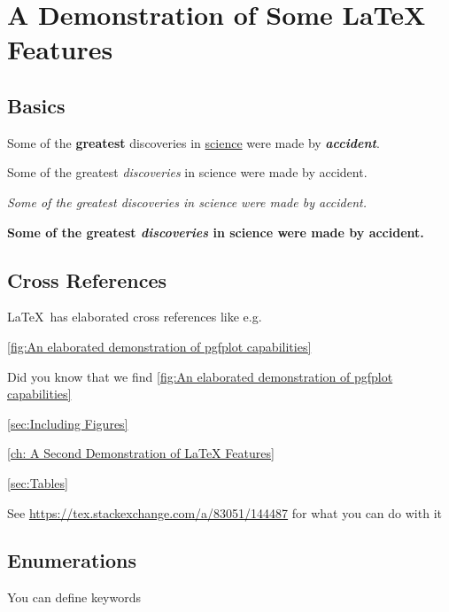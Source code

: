 \chapter[Demo]{A Demonstration of Some LaTeX Features}
\label{ch: demo}

\section{Basics}
\label{sec:Basics}

Some of the \textbf{greatest}
discoveries in \underline{science}
were made by \textbf{\textit{accident}}.

Some of the greatest \emph{discoveries}
in science
were made by accident.

\textit{Some of the greatest \emph{discoveries}
    in science
    were made by accident.}

\textbf{Some of the greatest \emph{discoveries}
    in science
    were made by accident.}

\section{Cross References}
\label{sec:Cross References}

\LaTeX\ has elaborated cross references like e.g.
\begin{compactitem}[$\blacksquare$]
    \item \vref{fig:An elaborated demonstration of pgfplot capabilities}
    \item Did you know that  we find
    \cref{fig:An elaborated demonstration of pgfplot capabilities}
    \item \vref{sec:Including Figures}
    \item \vref{ch: A Second Demonstration of LaTeX Features}
    \item \vref{sec:Tables}
\end{compactitem}

See \url{https://tex.stackexchange.com/a/83051/144487} for what you can do with it

\pagebreak

\section{Enumerations}
\label{sec:Enumerations}

You can define keywords

